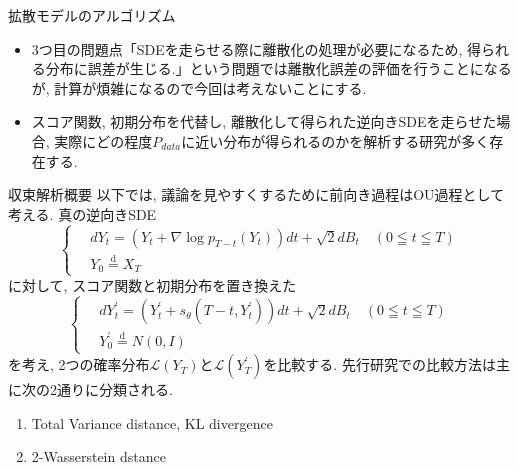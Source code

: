 \documentclass[dvipdfmx,11pt]{beamer}
\theoremstyle{plain}
\theoremstyle{定義}
\begin{document}
  \begin{frame}{拡散モデルのアルゴリズム}
    \begin{itemize}
        \item 3つ目の問題点「SDEを走らせる際に離散化の処理が必要になるため, 得られる分布に誤差が生じる.」という問題では離散化誤差の評価を行うことになるが, 計算が煩雑になるので今回は考えないことにする.
        \item スコア関数, 初期分布を代替し, 離散化して得られた逆向きSDEを走らせた場合, 実際にどの程度$P_{data}$に近い分布が得られるのかを解析する研究が多く存在する.
    \end{itemize}
  \end{frame}
  \begin{frame}{収束解析概要}
    以下では, 議論を見やすくするために前向き過程はOU過程として考える.
    真の逆向きSDE
    \begin{equation}
        \left\{ \,
            \begin{aligned}
            & dY_t = (Y_t+\nabla \log{p_{T-t}(Y_t)})dt+\sqrt{2}dB_t \quad (0\leqq t \leqq T) \\
            & Y_0 \stackrel{\mathrm{d}}{=} X_T
            \end{aligned}
        \right.
    \end{equation}
    に対して, スコア関数と初期分布を置き換えた
    \begin{equation}
        \left\{ \,
            \begin{aligned}
            & dY^{\prime}_t = (Y^{\prime}_t+s_{\theta}(T-t,Y^{\prime}_t))dt+\sqrt{2}dB_t \quad (0\leqq t \leqq T) \\
            & Y^{\prime}_0 \stackrel{\mathrm{d}}{=} N(0,I)
            \end{aligned}
        \right.
    \end{equation}
    を考え, 2つの確率分布$\mathcal{L}(Y_T)$と$\mathcal{L}(Y^{\prime}_T)$を比較する.
    先行研究での比較方法は主に次の2通りに分類される.
    \begin{enumerate}
        \item Total Variance distance, KL divergence
        \item 2-Wasserstein dstance
    \end{enumerate}
  \end{frame}
\end{document}

